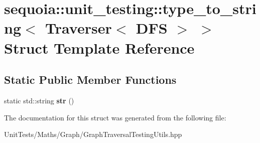 \hypertarget{structsequoia_1_1unit__testing_1_1type__to__string_3_01_traverser_3_01_d_f_s_01_4_01_4}{}\section{sequoia\+::unit\+\_\+testing\+::type\+\_\+to\+\_\+string$<$ Traverser$<$ D\+FS $>$ $>$ Struct Template Reference}
\label{structsequoia_1_1unit__testing_1_1type__to__string_3_01_traverser_3_01_d_f_s_01_4_01_4}
\subsection*{Static Public Member Functions}
\begin{DoxyCompactItemize}
\item 
\mbox{\label{structsequoia_1_1unit__testing_1_1type__to__string_3_01_traverser_3_01_d_f_s_01_4_01_4_a877833a80b0e5fa3cd66032534862745}} 
static std\+::string {\bfseries str} ()
\end{DoxyCompactItemize}


The documentation for this struct was generated from the following file\+:\begin{DoxyCompactItemize}
\item 
Unit\+Tests/\+Maths/\+Graph/Graph\+Traversal\+Testing\+Utils.\+hpp\end{DoxyCompactItemize}
